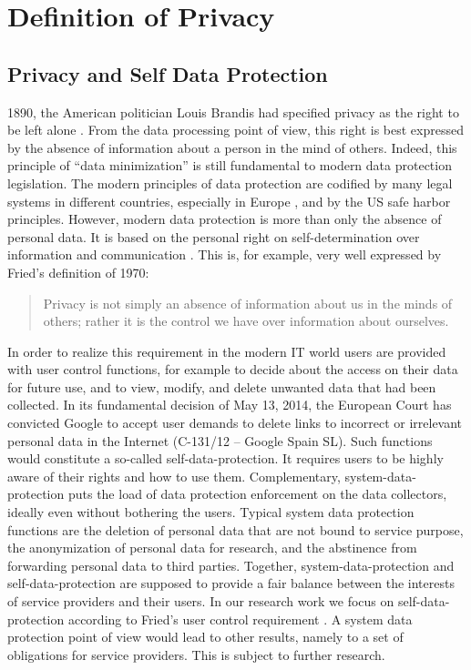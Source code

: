 \documentclass[runningheads,a4paper]{llncs}
\begin{document}
\section{Definition of Privacy}
\label{sec:privacydef}


\subsection{Privacy and Self Data Protection}
1890, the American politician Louis Brandis had specified privacy as the right to be left alone \cite{WarrenBrandeis:RightToPrivacy}. From the data processing point of view, this right is best expressed by the absence of information about a person in the mind of others. Indeed, this principle of “data minimization” is still fundamental to modern data protection legislation. The modern principles of data protection are codified by many legal systems in different countries, especially in Europe \cite{EU-directive2}, and by the US safe harbor principles. However, modern data protection is more than only the absence of personal data. It is based on the personal right on self-determination over information and communication \cite{BVerfG:census}. This is, for example, very well expressed by Fried’s definition of 1970:
\begin{quote}
	Privacy is not simply an absence of information about us in the minds of others; rather it is the control we have over information about ourselves. \cite{CFried:Privacy}
\end{quote}
In order to realize this requirement in the modern IT world users are provided with user control functions, for example to decide about the access on their data for future use, and to view, modify, and delete unwanted data that had been collected. In its fundamental decision of May 13, 2014, the European Court has convicted Google to accept user demands to delete links to incorrect or irrelevant personal data in the Internet (C-131/12 – Google Spain SL). Such functions would constitute a so-called self-data-protection. It requires users to be highly aware of their rights and how to use them. Complementary, system-data-protection puts the load of data protection enforcement on the data collectors, ideally even without bothering the users. Typical system data protection functions are the deletion of personal data that are not bound to service purpose, the anonymization of personal data for research, and the abstinence from forwarding personal data to third parties. Together, system-data-protection and self-data-protection are supposed to provide a fair balance between the interests of service providers and their users.
In our research work we focus on self-data-protection according to Fried’s user control requirement \cite{CFried:Privacy}. A system data protection point of view would lead to other results, namely to a set of obligations for service providers. This is subject to further research.
\end{document}
